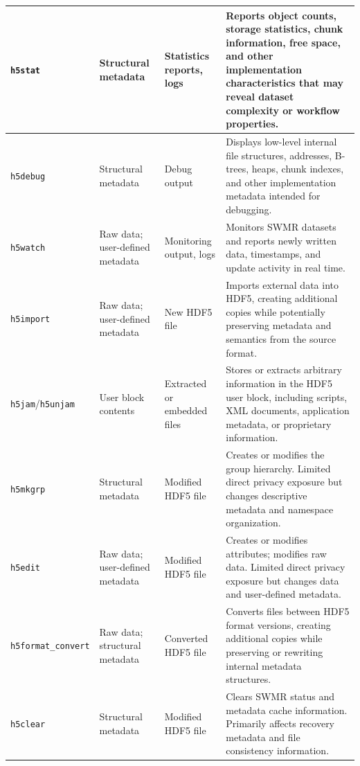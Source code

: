 \documentclass[../main.tex]{subfiles}
\begin{document}
\begin{longtable}{@{}p{0.12\widetablewidth}p{0.22\widetablewidth}p{0.18\widetablewidth}p{0.48\widetablewidth}@{}}
\texttt{h5stat} &
Structural metadata &
Statistics reports, logs &
Reports object counts, storage statistics, chunk information, free space, and other implementation characteristics that may reveal dataset complexity or workflow properties.\\
\hline

\texttt{h5debug} &
Structural metadata &
Debug output &
Displays low-level internal file structures, addresses, B-trees, heaps, chunk indexes, and other implementation metadata intended for debugging.\\
\hline

\texttt{h5watch} &
Raw data; user-defined metadata &
Monitoring output, logs &
Monitors SWMR datasets and reports newly written data, timestamps, and update activity in real time.\\
\hline

\texttt{h5import} &
Raw data; user-defined metadata &
New HDF5 file &
Imports external data into HDF5, creating additional copies while potentially preserving metadata and semantics from the source format.\\
\hline

\texttt{h5jam}/\texttt{h5unjam} &
User block contents &
Extracted or embedded files &
Stores or extracts arbitrary information in the HDF5 user block, including scripts, XML documents, application metadata, or proprietary information.\\
\hline

\texttt{h5mkgrp} &
Structural metadata &
Modified HDF5 file &
Creates or modifies the group hierarchy. Limited direct privacy exposure but changes descriptive metadata and namespace organization.\\
\hline

\texttt{h5edit} &
Raw data; user-defined metadata &
Modified HDF5 file &
Creates or modifies attributes; modifies raw data. Limited direct privacy exposure but changes data and user-defined metadata.\\
\hline

\texttt{h5format\_convert} &
Raw data; structural metadata &
Converted HDF5 file &
Converts files between HDF5 format versions, creating additional copies while preserving or rewriting internal metadata structures.\\
\hline

\texttt{h5clear} &
Structural metadata &
Modified HDF5 file &
Clears SWMR status and metadata cache information. Primarily affects recovery metadata and file consistency information.\\

\end{longtable}
\endgroup
\end{document}
